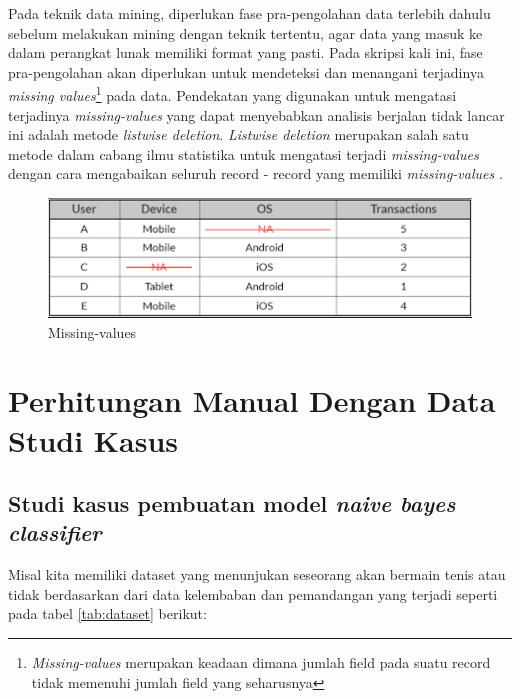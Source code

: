 Pada teknik data mining, diperlukan fase pra-pengolahan data terlebih dahulu sebelum melakukan mining dengan teknik tertentu, agar data yang masuk ke dalam perangkat lunak memiliki format yang pasti. Pada skripsi kali ini, fase pra-pengolahan akan diperlukan untuk mendeteksi dan menangani terjadinya \textit{missing values}\footnote{\textit{Missing-values} merupakan keadaan dimana jumlah field pada suatu record tidak memenuhi jumlah field yang seharusnya} pada data. Pendekatan yang digunakan untuk mengatasi terjadinya \textit{missing-values} yang dapat menyebabkan analisis berjalan tidak lancar ini adalah metode \textit{listwise deletion}. \textit{Listwise deletion} merupakan salah satu metode dalam cabang ilmu statistika untuk mengatasi terjadi \textit{missing-values} dengan cara mengabaikan seluruh record - record yang memiliki \textit{missing-values} \cite{PeughMissing:2004}.

\begin{figure}[ht]
	\centering
	\includegraphics[scale=0.5]{GambarIO/Missing-values}
	\caption[Missing-values]{Missing-values \cite{MissingVal:2016}} 
	\label{fig:Missing-values}
\end{figure}

\section{Perhitungan Manual Dengan Data Studi Kasus}

\subsection{Studi kasus pembuatan model \textit{naive bayes classifier}}
Misal kita memiliki dataset yang menunjukan seseorang akan bermain tenis atau tidak berdasarkan dari data kelembaban dan pemandangan yang terjadi seperti pada tabel \ref{tab:dataset} berikut: 
		
